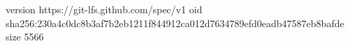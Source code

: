 version https://git-lfs.github.com/spec/v1
oid sha256:230a4c0dc8b3af7b2eb1211f844912ca012d7634789efd0eadb47587eb8bafde
size 5566
